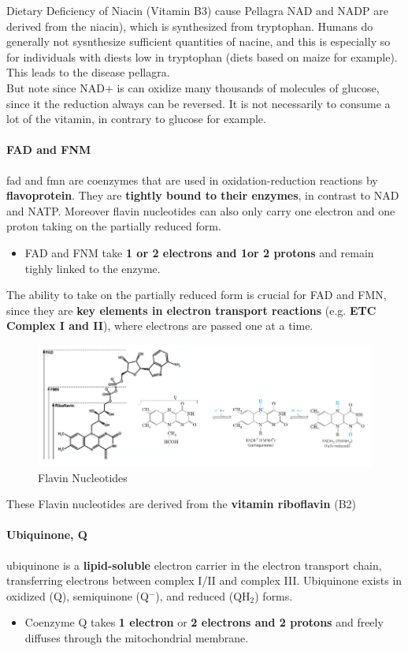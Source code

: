 \documentclass[../main.tex]{subfiles}
\begin{document}
\begin{RemarkWithTitel}{Dietary Deficiency of Niacin (Vitamin B3) cause Pellagra}
	NAD and NADP are derived from the \gls{niacin}), which is synthesized from tryptophan. Humans do generally not sysnthesize sufficient quantities of nacine, and this is especially so for individuals with diests low in tryptophan (diets based on maize for example). This leads to the disease pellagra. \\
	But note since NAD+ is can oxidize many thousands of molecules of glucose, since it the reduction always can be reversed. It is not necessarily to consume a lot of the vitamin, in contrary to glucose for example.  
\end{RemarkWithTitel}


\paragraph{FAD and FNM}
\gls{fad} and \gls{fmn} are coenzymes that are used in oxidation-reduction reactions by \textbf{\gls{flavoprotein}}. They are \textbf{tightly bound to their enzymes}, in contrast to NAD and NATP. Moreover flavin nucleotides can also only carry one electron and one proton taking on the partially reduced form. 
\begin{itemize}
	\item FAD and FNM take \textbf{1 or 2 electrons and 1or 2 protons} and remain tighly linked to the enzyme.
\end{itemize}
The ability to take on the partially reduced form is crucial for FAD and FMN, since they are \textbf{key elements in electron transport reactions} (e.g. \textbf{ETC Complex I and II}), where electrons are passed one at a time. 

\begin{figure}[H]
	\centering
	\includegraphics[width = 0.9 \textwidth]{FAD}
	\caption{Flavin Nucleotides}
\end{figure}
These Flavin nucleotides are derived from the \textbf{vitamin riboflavin} (B2)

\paragraph{Ubiquinone, Q}
\gls{ubiquinone} is a \textbf{lipid-soluble} electron carrier in the electron transport chain, transferring electrons between complex I/II and complex III. Ubiquinone exists in oxidized (Q), semiquinone (Q$^-$), and reduced (QH$_2$) forms.
\begin{itemize}
	\item Coenzyme Q takes \textbf{1 electron} or \textbf{2 electrons and 2 protons} and freely diffuses through the mitochondrial membrane.
\end{itemize}
\end{document}
